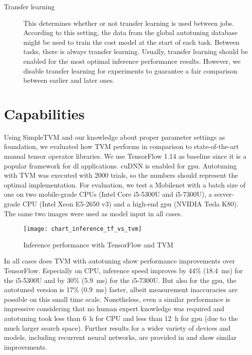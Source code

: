 \begin{description}
	\item[Transfer learning] This determines whether or not transfer learning is used between jobs. According to this setting, the data from the global autotuning database might be used to train the cost model at the start of each task. Between tasks, there is always transfer learning. Usually, transfer learning should be enabled for the most optimal inference performance results. However, we disable transfer learning for experiments to guarantee a fair comparison between earlier and later ones.
\end{description}


\section{Capabilities}
Using SimpleTVM and our knowledge about proper parameter settings as foundation, we evaluated how TVM performs in comparison to state-of-the-art manual tensor operator libraries. We use TensorFlow 1.14 as baseline since it is a popular framework for \gls{dl} applications. cuDNN is enabled for \gls{gpu}. Autotuning with TVM was executed with 2000 trials, so the numbers should represent the optimal implementation. For evaluation, we test a Mobilenet with a batch size of one on two mobile-grade CPUs (Intel Core i5-5300U and i5-7300U), a server-grade CPU (Intel Xeon E5-2650 v3) and a high-end \gls{gpu} (NVIDIA Tesla K80). The same two images were used as model input in all cases.

\begin{figure}[h]
	\centering
	\texttt{[image: chart\_inference\_tf\_vs\_tvm]}%
	\caption{Inference performance with TensorFlow and TVM}
	\label{fig:inf-tf-tvm}
\end{figure}

In all cases does TVM with autotuning show performance improvements over TensorFlow. Especially on CPU, inference speed improves by 44\% (\SI{18.4}{\milli\second}) for the i5-5300U and by 30\% (\SI{5.9}{\milli\second}) for the i5-7300U. But also for the \gls{gpu}, the autotuned version is 17\% (\SI{0.9}{\milli\second}) faster, albeit measurement inaccuracies are possible on this small time scale. Nonetheless, even a similar performance is impressive considering that no human expert knowledge was required and autotuning took less than \SI{6}{\hour} for CPU and less than \SI{12}{\hour} for \gls{gpu} (due to the much larger search space). Further results for a wider variety of devices and models, including recurrent neural networks, are provided in \cite{Chen.2018} and show similar improvements.

